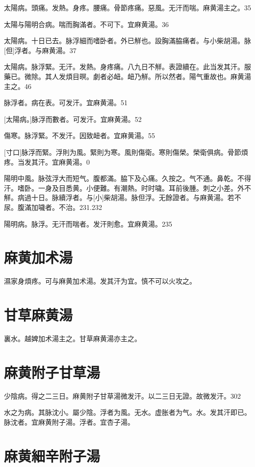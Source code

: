 \documentclass[12pt,oneside,UTF8,b5paper]{ctexbook}她她她她她她她
\begin{document}
太陽病。頭痛。发熱。身疼。腰痛。骨節疼痛。惡風。无汗而喘。麻黄湯主之。35

太陽与陽明合病。喘而胸滿者。不可下。宜麻黄湯。36

太陽病。十日已去。脉浮細而嗜卧者。外已觧也。設胸滿脇痛者。与小柴胡湯。脉[但]浮者。与麻黄湯。37

太陽病。脉浮緊。无汗。发熱。身疼痛。八九日不觧。表證續在。此当发其汗。服藥已。微除。其人发煩目暝。劇者必衄。衄乃觧。所以然者。陽气重故也。麻黄湯主之。46

脉浮者。病在表。可发汗。宜麻黄湯。51

[太陽病。]脉浮而數者。可发汗。宜麻黄湯。52

傷寒。脉浮緊。不发汗。因致衄者。宜麻黄湯。55

[寸口]脉浮而緊。浮則为風。緊則为寒。風則傷衛。寒則傷榮。榮衛俱病。骨節煩疼。当发其汗。宜麻黄湯。0

陽明中風。脉弦浮大而短气。腹都滿。脇下及心痛。久按之。气不通。鼻乾。不得汗。嗜卧。一身及目悉黄。小便難。有潮熱。时时噦。耳前後腫。刺之小差。外不觧。病過十日。脉續浮者。与[小]柴胡湯。脉但浮。无餘證者。与麻黄湯。若不尿。腹滿加噦者。不治。231.232

陽明病。脉浮。无汗而喘者。发汗則愈。宜麻黄湯。235

\section{麻黄加术湯}

濕家身煩疼。可与麻黄加术湯。发其汗为宜。慎不可以火攻之。

\section{甘草麻黄湯}

裏水。越婢加术湯主之。甘草麻黄湯亦主之。

\section{麻黄附子甘草湯}

少陰病。得之二三日。麻黄附子甘草湯微发汗。以二三日无證。故微发汗。302

水之为病。其脉沈小。屬少陰。浮者为風。无水。虚胀者为气。水。发其汗即已。脉沈者。宜麻黄附子湯。浮者。宜杏子湯。

\section{麻黄細辛附子湯}
\end{document}
